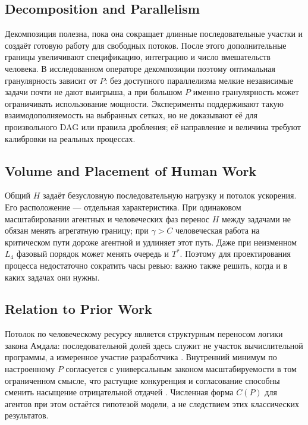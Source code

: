 \subsection{Decomposition and Parallelism}

Декомпозиция полезна, пока она сокращает длинные последовательные участки и
создаёт готовую работу для свободных потоков. После этого дополнительные
границы увеличивают спецификацию, интеграцию и число вмешательств человека.
В исследованном операторе декомпозиции поэтому оптимальная гранулярность зависит
от $P$: без доступного параллелизма мелкие независимые задачи почти не дают
выигрыша, а при большом $P$ именно гранулярность может ограничивать
использование мощности. Эксперименты поддерживают такую взаимодополняемость на
выбранных сетках, но не доказывают её для произвольного DAG или правила
дробления; её направление и величина требуют калибровки на реальных процессах.

\subsection{Volume and Placement of Human Work}

Общий $H$ задаёт безусловную последовательную нагрузку и потолок ускорения.
Его расположение --- отдельная характеристика. При одинаковом масштабировании
агентных и человеческих фаз перенос $H$ между задачами не обязан менять
агрегатную границу; при $\gamma>C$ человеческая работа на критическом пути
дороже агентной и удлиняет этот путь. Даже при неизменном $L_4$ фазовый порядок
может менять очередь и $T^*$. Поэтому для проектирования процесса недостаточно
сократить часы ревью: важно также решить, когда и в каких задачах они нужны.

\subsection{Relation to Prior Work}

Потолок по человеческому ресурсу является структурным переносом логики закона
Амдала: последовательной долей здесь служит не участок вычислительной
программы, а измеренное участие разработчика \cite{amdahl1967validity}. Внутренний
минимум по настроенному $P$ согласуется с универсальным законом масштабируемости
в том ограниченном смысле, что растущие конкуренция и согласование способны
сменить насыщение отрицательной отдачей \cite{gunther2008general}. Численная
форма $C(P)$ для агентов при этом остаётся гипотезой модели, а не следствием
этих классических результатов.

